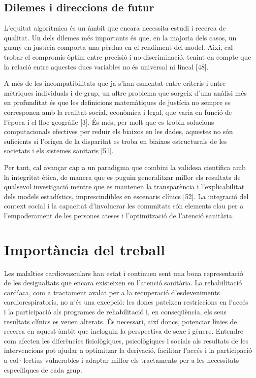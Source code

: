 \documentclass[CAT]{TFUOC}%
\begin{document}
\subsection{Dilemes i direccions de futur}\label{dilemes-i-direccions-de-futur}

L'equitat algorítmica és un àmbit que encara necessita estudi i recerca de qualitat. Un dels dilemes més importants és que, en la majoria dels casos, un guany en justícia comporta una pèrdua en el rendiment del model. Així, cal trobar el compromís òptim entre precisió i no-discriminació, tenint en compte que la relació entre aquestes dues variables no és universal ni lineal {[}48{]}.

A més de les incompatibilitats que ja s'han esmentat entre criteris i entre mètriques individuals i de grup, un altre problema que sorgeix d'una anàlisi més en profunditat és que les definicions matemàtiques de justícia no sempre es corresponen amb la realitat social, econòmica i legal, que varia en funció de l'època i el lloc geogràfic {[}3{]}. És més, per molt que es trobin solucions computacionals efectives per reduir els biaixos en les dades, aquestes no són suficients si l'origen de la disparitat es troba en biaixos estructurals de les societats i els sistemes sanitaris {[}51{]}.

Per tant, cal avançar cap a un paradigma que combini la validesa científica amb la integritat ètica, de manera que es puguin generalitzar millor els resultats de qualsevol investigació mentre que es mantenen la transparència i l'explicabilitat dels models estadístics, imprescindibles en escenaris clínics {[}52{]}. La integració del context social i la capacitat d'involucrar les comunitats són elements clau per a l'empoderament de les persones ateses i l'optimització de l'atenció sanitària.

\section{Importància del treball}\label{importuxe0ncia-del-treball}

Les malalties cardiovasculars han estat i continuen sent una bona representació de les desigualtats que encara existeixen en l'atenció sanitària. La rehabilitació cardíaca, com a tractament avalat per a la recuperació d'esdeveniments cardiorespiratoris, no n'és una excepció: les dones pateixen restriccions en l'accés i la participació als programes de rehabilitació i, en conseqüència, els seus resultats clínics es veuen alterats. És necessari, així doncs, potenciar línies de recerca en aquest àmbit que incloguin la perspectiva de sexe i gènere. Entendre com afecten les diferències fisiològiques, psicològiques i socials als resultats de les intervencions pot ajudar a optimitzar la derivació, facilitar l'accés i la participació a col·lectius vulnerables i adaptar millor els tractaments per a les necessitats específiques de cada grup.
\end{document}

